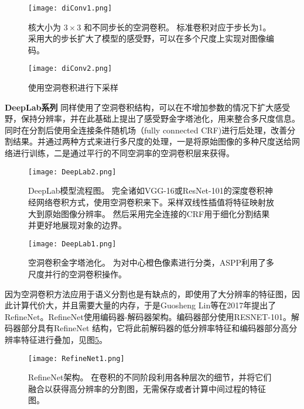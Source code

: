 \begin{figure}[h]
\begin{center}
\texttt{[image: diConv1.png]}
\end{center}
\caption{核大小为 $3\times3$ 和不同步长的空洞卷积\cite{yu2015multi}。 标准卷积对应于步长为1。采用大的步长扩大了模型的感受野，可以在多个尺度上实现对图像编码。}
\label{fig:dilatedConv1}
\end{figure}

\begin{figure}[h]
\begin{center}
\texttt{[image: diConv2.png]}
\end{center}
\caption{使用空洞卷积\cite{yu2015multi}进行下采样}
\label{fig:dilatedConv2}
\end{figure}


\textbf{DeepLab系列}
\cite{chen2017deeplab}
同样使用了空洞卷积结构，可以在不增加参数的情况下扩大感受野，保持分辨率，并在此基础上提出了感受野金字塔池化，用来整合多尺度信息。同时在分割后使用全连接条件随机场（fully connected CRF)进行后处理，改善分割结果。并通过两种方式来进行多尺度的处理，一是将原始图像的多种尺度送给网络进行训练，二是通过平行的不同空洞率的空洞卷积层来获得。

\begin{figure}[ht]
\begin{center}
\texttt{[image: DeepLab2.png]}
\end{center}
\caption{DeepLab模型流程图\cite{chen2017deeplab}。 完全诸如VGG-16或ResNet-101的深度卷积神经网络卷积方式，使用空洞卷积来下。采样双线性插值将特征映射放大到原始图像分辨率。 然后采用完全连接的CRF用于细化分割结果并更好地展现对象的边界。}
\label{fig:DeepLab2}
\end{figure}

\begin{figure}[ht]
\begin{center}
\texttt{[image: DeepLab1.png]}
\end{center}
\caption{空洞卷积金字塔池化\cite{chen2017deeplab}。 为对中心橙色像素进行分类，ASPP利用了多尺度并行的空洞卷积操作。}
\label{fig:DeepLab1}
\end{figure}

因为空洞卷积方法应用于语义分割也是有缺点的，即使用了大分辨率的特征图，因此计算代价大，并且需要大量的内存，于是Guosheng Lin等在2017年提出了RefineNet\cite{lin2017refinenet}。RefineNet使用编码器-解码器架构。编码器部分使用RESNET-101。解码器部分具有RefineNet 结构，它将此前解码器的低分辨率特征和编码器部分高分辨率特征进行叠加，见图\ref{fig:RefineNet1}。
\begin{figure}[ht]
\begin{center}
\texttt{[image: RefineNet1.png]}
\end{center}
\caption{RefineNet架构\cite{lin2017refinenet}。 在卷积的不同阶段利用各种层次的细节，并将它们融合以获得高分辨率的分割图，无需保存或者计算中间过程的特征图。}
\label{fig:RefineNet1}
\end{figure}

